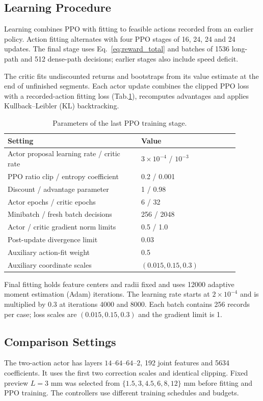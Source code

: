 \documentclass[preprint,12pt,nonatbib]{elsarticle}
\newcommand{\tabref}[1]{Tab.\nobreakspace\ref{#1}}
\begin{document}
\subsection{Learning Procedure}
Learning combines PPO with fitting to feasible actions recorded from an earlier policy. Action fitting alternates with four PPO stages of 16, 24, 24 and 24 updates. The final stage uses Eq.~\eqref{eq:reward_total} and batches of 1536 long-path and 512 dense-path decisions; earlier stages also include speed deficit.

The critic fits undiscounted returns and bootstraps from its value estimate at the end of unfinished segments. Each actor update combines the clipped PPO loss with a recorded-action fitting loss (\tabref{tab:ppo_details}), recomputes advantages and applies Kullback--Leibler (KL) backtracking.

\begin{table}[htbp]
\centering
\caption{Parameters of the last PPO training stage.}
\label{tab:ppo_details}
\small
\begin{tabular}{p{0.52\linewidth}p{0.38\linewidth}}
\toprule
Setting & Value\\
\midrule
Actor proposal learning rate / critic rate & $3\times10^{-4}$ / $10^{-3}$\\
PPO ratio clip / entropy coefficient & 0.2 / 0.001\\
Discount / advantage parameter & 1 / 0.98\\
Actor epochs / critic epochs & 6 / 32\\
Minibatch / fresh batch decisions & 256 / 2048\\
Actor / critic gradient norm limits & 0.5 / 1.0\\
Post-update divergence limit & 0.03\\
Auxiliary action-fit weight & 0.5\\
Auxiliary coordinate scales & $(0.015,0.15,0.3)$\\
\bottomrule
\end{tabular}
\end{table}

Final fitting holds feature centers and radii fixed and uses 12000 adaptive moment estimation (Adam) iterations. The learning rate starts at $2\times10^{-4}$ and is multiplied by 0.3 at iterations 4000 and 8000. Each batch contains 256 records per case; loss scales are $(0.015,0.15,0.3)$ and the gradient limit is 1.

\subsection{Comparison Settings}
The two-action actor has layers $14$--$64$--$64$--$2$, 192 joint features and 5634 coefficients. It uses the first two correction scales and identical clipping. Fixed preview $L=3$ mm was selected from $\{1.5,3,4.5,6,8,12\}$ mm before fitting and PPO training. The controllers use different training schedules and budgets.
\end{document}
